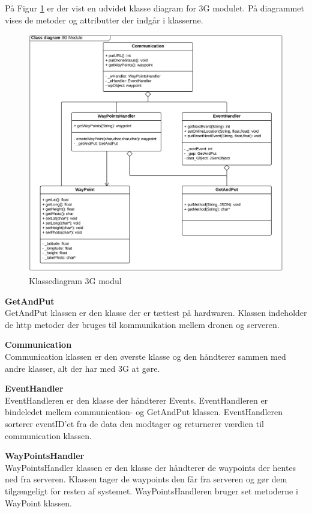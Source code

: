 På Figur \ref{fig:classDiagram_3Gmodul} er der vist en udvidet klasse diagram for 3G modulet. På diagrammet vises de metoder og attributter der indgår i klasserne. 

\begin{figure}[H]
	\centering
	\includegraphics[width=1.1\textwidth]{Billeder/klasse_diagrammer/classdiagram_3gmodule.png}
	\vspace{0cm}
	\caption{Klassediagram 3G modul}
	\label{fig:classDiagram_3Gmodul}
\end{figure}


\textbf{GetAndPut} \\
GetAndPut klassen er den klasse der er tættest på hardwaren. Klassen indeholder de http metoder der bruges til kommunikation mellem dronen og serveren. 

\textbf{Communication} \\
Communication klassen er den øverste klasse og den håndterer sammen med andre klasser, alt der har med 3G at gøre.

\textbf{EventHandler} \\
EventHandleren er den klasse der håndterer Events. EventHandleren er bindeledet mellem communication- og GetAndPut klassen. EventHandleren sorterer eventID'et fra de data den modtager og returnerer værdien til communication klassen.

\textbf{WayPointsHandler} \\
WayPointsHandler klassen er den klasse der håndterer de waypoints der hentes ned fra serveren. Klassen tager de waypoints den får fra serveren og gør dem tilgængeligt for resten af systemet. WayPointsHandleren bruger set metoderne i WayPoint klassen.

